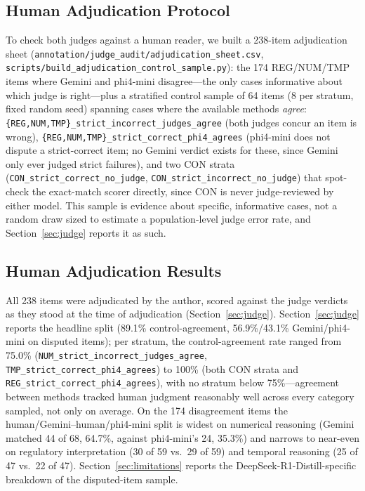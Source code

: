 \subsection{Human Adjudication Protocol}

To check both judges against a human reader, we built a 238-item adjudication sheet (\texttt{annotation/judge\_audit/adjudication\_sheet.csv}, \texttt{scripts/build\_adjudication\_control\_sample.py}): the 174 REG/NUM/TMP items where Gemini and phi4-mini disagree---the only cases informative about which judge is right---plus a stratified control sample of 64 items (8 per stratum, fixed random seed) spanning cases where the available methods \emph{agree}: \texttt{\{REG,NUM,TMP\}\_strict\_incorrect\_judges\_agree} (both judges concur an item is wrong), \texttt{\{REG,NUM,TMP\}\_strict\_correct\_phi4\_agrees} (phi4-mini does not dispute a strict-correct item; no Gemini verdict exists for these, since Gemini only ever judged strict failures), and two CON strata (\texttt{CON\_strict\_correct\_no\_judge}, \texttt{CON\_strict\_incorrect\_no\_judge}) that spot-check the exact-match scorer directly, since CON is never judge-reviewed by either model. This sample is evidence about specific, informative cases, not a random draw sized to estimate a population-level judge error rate, and Section~\ref{sec:judge} reports it as such.

\subsection{Human Adjudication Results}

All 238 items were adjudicated by the author, scored against the judge verdicts as they stood at the time of adjudication (Section~\ref{sec:judge}). Section~\ref{sec:judge} reports the headline split (89.1\% control-agreement, 56.9\%/43.1\% Gemini/phi4-mini on disputed items); per stratum, the control-agreement rate ranged from 75.0\% (\texttt{NUM\_strict\_incorrect\_judges\_agree}, \texttt{TMP\_strict\_correct\_phi4\_agrees}) to 100\% (both CON strata and \texttt{REG\_strict\_correct\_phi4\_agrees}), with no stratum below 75\%---agreement between methods tracked human judgment reasonably well across every category sampled, not only on average. On the 174 disagreement items the human/Gemini--human/phi4-mini split is widest on numerical reasoning (Gemini matched 44 of 68, 64.7\%, against phi4-mini's 24, 35.3\%) and narrows to near-even on regulatory interpretation (30 of 59 vs.\ 29 of 59) and temporal reasoning (25 of 47 vs.\ 22 of 47). Section~\ref{sec:limitations} reports the DeepSeek-R1-Distill-specific breakdown of the disputed-item sample.

